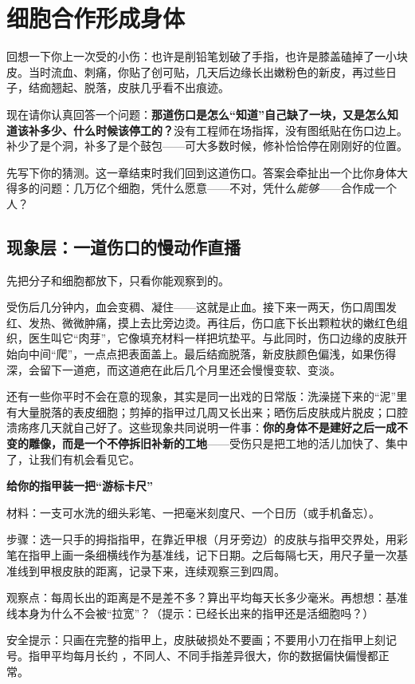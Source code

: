 \chapter{细胞合作形成身体}

\begin{kaichang}
回想一下你上一次受的小伤：也许是削铅笔划破了手指，也许是膝盖磕掉了一小块皮。当时流血、刺痛，你贴了创可贴，几天后边缘长出嫩粉色的新皮，再过些日子，结痂翘起、脱落，皮肤几乎看不出痕迹。

现在请你认真回答一个问题：\textbf{那道伤口是怎么“知道”自己缺了一块，又是怎么知道该补多少、什么时候该停工的？}没有工程师在场指挥，没有图纸贴在伤口边上。补少了是个洞，补多了是个鼓包——可大多数时候，修补恰恰停在刚刚好的位置。

先写下你的猜测。这一章结束时我们回到这道伤口。答案会牵扯出一个比你身体大得多的问题：几万亿个细胞，凭什么愿意——不对，凭什么\emph{能够}——合作成一个人？
\end{kaichang}

\section{现象层：一道伤口的慢动作直播}

先把分子和细胞都放下，只看你能观察到的。

受伤后几分钟内，血会变稠、凝住——这就是止血。接下来一两天，伤口周围发红、发热、微微肿痛，摸上去比旁边烫。再往后，伤口底下长出颗粒状的嫩红色组织，医生叫它“肉芽”，它像填充材料一样把坑垫平。与此同时，伤口边缘的皮肤开始向中间“爬”，一点点把表面盖上。最后结痂脱落，新皮肤颜色偏浅，如果伤得深，会留下一道疤，而这道疤在此后几个月里还会慢慢变软、变淡。

还有一些你平时不会在意的现象，其实是同一出戏的日常版：洗澡搓下来的“泥”里有大量脱落的表皮细胞；剪掉的指甲过几周又长出来；晒伤后皮肤成片脱皮；口腔溃疡疼几天就自己好了。这些现象共同说明一件事：\textbf{你的身体不是建好之后一成不变的雕像，而是一个不停拆旧补新的工地}——受伤只是把工地的活儿加快了、集中了，让我们有机会看见它。

\begin{shiyan}
\textbf{给你的指甲装一把“游标卡尺”}

材料：一支可水洗的细头彩笔、一把毫米刻度尺、一个日历（或手机备忘）。

步骤：选一只手的拇指指甲，在靠近甲根（月牙旁边）的皮肤与指甲交界处，用彩笔在指甲上画一条细横线作为基准线，记下日期。之后每隔七天，用尺子量一次基准线到甲根皮肤的距离，记录下来，连续观察三到四周。

观察点：每周长出的距离是不是差不多？算出平均每天长多少毫米。再想想：基准线本身为什么不会被“拉宽”？（提示：已经长出来的指甲还是活细胞吗？）

安全提示：只画在完整的指甲上，皮肤破损处不要画；不要用小刀在指甲上刻记号。指甲平均每月长约 ，不同人、不同手指差异很大，你的数据偏快偏慢都正常。
\end{shiyan}

